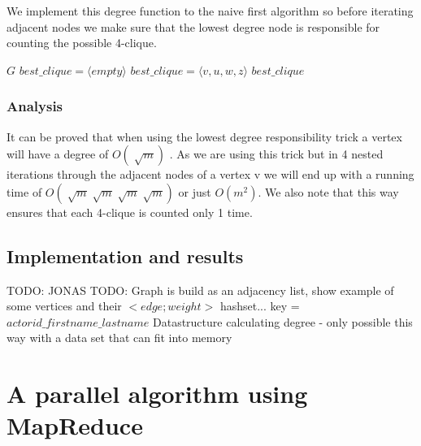 \documentclass{article}
\begin{document}
We implement this degree function to the naive first algorithm so before iterating adjacent nodes we make sure that the lowest degree node is responsible for counting the possible 4-clique.

\begin{algorithm}
\caption{$strong\_4clique\_finder++$}
\begin{algorithmic}
\REQUIRE $G$
\STATE $best\_clique = \langle empty\rangle $
\STATE $best\_clique = \langle v,u,w,z\rangle $
\ENDIF
\ENDIF
\ENDFOR
\ENDIF
\ENDFOR
\ENDIF
\ENDFOR
\ENDFOR
\RETURN $best\_clique$
\end{algorithmic}
\end{algorithm}

\subsubsection{Analysis}
It can be proved that when using the lowest degree responsibility trick a vertex will have a degree of $O(\sqrt[]{m})$ \cite{AlgorithmicAspects}. As we are using this trick but in 4 nested iterations through the adjacent nodes of a vertex v we will end up with a running time of $O(\sqrt[]{m}\sqrt[]{m}\sqrt[]{m}\sqrt[]{m})$ or just $O(m^{2})$. We also note that this way ensures that each 4-clique is counted only 1 time.


\subsection{Implementation and results}
TODO: JONAS
TODO: Graph is build as an adjacency list, show example of some vertices and their $<edge;weight>$ hashset...
key = $actorid\_firstname\_lastname$
Datastructure calculating degree - only possible this way with a data set that can fit into memory

\section{A parallel algorithm using MapReduce}
\end{document}

